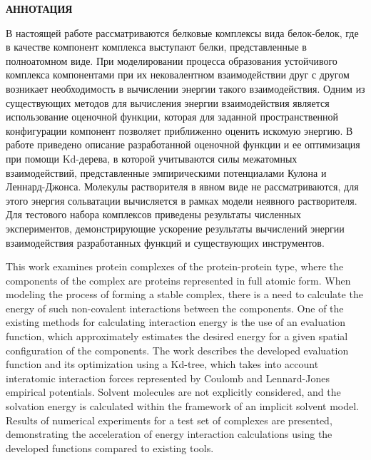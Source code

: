 \newpage
\begin{center}
  \textbf{\large АННОТАЦИЯ}
\end{center}

В настоящей работе рассматриваются белковые комплексы вида белок-белок, где в качестве компонент комплекса выступают белки, представленные в полноатомном виде. При моделировании процесса образования устойчивого комплекса компонентами при их нековалентном взаимодействии друг с другом возникает необходимость в вычислении энергии такого взаимодействия. Одним из существующих методов для вычисления энергии взаимодействия является использование оценочной функции, которая для заданной пространственной конфигурации компонент позволяет приближенно оценить искомую энергию. В работе приведено описание разработанной оценочной функции и ее оптимизация при помощи Kd-дерева, в которой учитываются силы межатомных взаимодействий, представленные эмпирическими потенциалами Кулона и Леннард-Джонса. Молекулы растворителя в явном виде не рассматриваются, для этого энергия сольватации вычисляется в рамках модели неявного растворителя. Для тестового набора комплексов приведены результаты численных экспериментов, демонстрирующие ускорение результаты вычислений энергии взаимодействия разработанных функций и существующих инструментов.

This work examines protein complexes of the protein-protein type, where the components of the complex are proteins represented in full atomic form. When modeling the process of forming a stable complex, there is a need to calculate the energy of such non-covalent interactions between the components. One of the existing methods for calculating interaction energy is the use of an evaluation function, which approximately estimates the desired energy for a given spatial configuration of the components. The work describes the developed evaluation function and its optimization using a Kd-tree, which takes into account interatomic interaction forces represented by Coulomb and Lennard-Jones empirical potentials. Solvent molecules are not explicitly considered, and the solvation energy is calculated within the framework of an implicit solvent model. Results of numerical experiments for a test set of complexes are presented, demonstrating the acceleration of energy interaction calculations using the developed functions compared to existing tools.

\onehalfspacing
\thispagestyle{empty} 

\newpage
\renewcommand{\contentsname}{\centerline{\large СОДЕРЖАНИЕ}}
\setcounter{page}{4}
\tableofcontents

